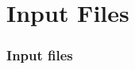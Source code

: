 \section[Inputs]{Input Files}
 
\graphicspath{{Chapter2/Figs/Vector/}{Chapter2/Figs/Raster/}}

\begin{frame}[t]
  \frametitle{Input files}
  \framesubtitle{}
  \label{fr2:satgeod3}

\end{frame}
\note{} %